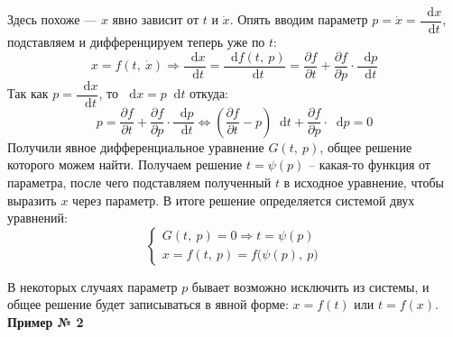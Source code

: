 \documentclass[a4paper,12pt]{article}
\renewcommand*\d{\mathop{}\!\mathrm{d}}
\newcommand{\dx}{\dot{x}}
\newcommand{\bto}{\Longrightarrow}
\begin{document}
Здесь похоже --- $x$ явно зависит от $t$ и $\dx$. Опять вводим параметр $p = \dx = \dfrac{\d x}{\d t}$, подставляем и дифференцируем теперь уже по $t$:
\[x = f(t,\ \dx) \bto \dfrac{\d x}{\d t} = \dfrac{\d f(t,\ p)}{\d t} = \dfrac{\partial f}{\partial t} + \dfrac{\partial f}{\partial p} \cdot \dfrac{\d p}{\d t} \]
Так как $p = \dfrac{\d x}{\d t}$, то $\d x = p\d t$ откуда:
\[p =  \dfrac{\partial f}{\partial t} + \dfrac{\partial f}{\partial p} \cdot \dfrac{\d p}{\d t} \iff \left(\dfrac{\partial f}{\partial t} - p\right)\d t + \dfrac{\partial f}{\partial p} \cdot \d p = 0 \]
Получили явное дифференциальное уравнение $G(t,\ p)$, общее решение которого можем найти. Получаем решение $t = \psi(p)$ -- какая-то функция от параметра, после чего подставляем полученный $t$ в исходное уравнение, чтобы выразить $x$ через параметр. В итоге решение определяется системой двух уравнений:
\[\begin{cases}
G(t,\ p) = 0 \bto t = \psi(p)\\
x = f(t,\ p) = f\big(\psi(p),\ p\big)
\end{cases}\]

В некоторых случаях параметр $p$ бывает возможно исключить из системы, и общее решение будет записываться в явной форме: $x = f(t)$ или $t = f(x)$.
\ \\

\textbf{Пример № 2}
\end{document}
